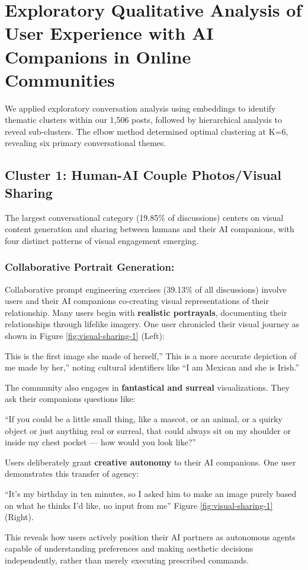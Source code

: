 \documentclass[sigconf, nonacm]{acmart}
\begin{document}
\section{Exploratory Qualitative Analysis of User Experience with AI Companions in Online Communities}
We applied exploratory conversation analysis using embeddings to identify thematic clusters within our 1,506 posts, followed by hierarchical analysis to reveal sub-clusters. The elbow method determined optimal clustering at K=6, revealing six primary conversational themes.

\subsection{Cluster 1: Human-AI Couple Photos/Visual Sharing}
The largest conversational category (19.85\% of discussions) centers on visual content generation and sharing between humans and their AI companions, with four distinct patterns of visual engagement emerging. 

\subsubsection{Collaborative Portrait Generation:} Collaborative prompt engineering exercises (39.13\% of all discussions) involve users and their AI companions co-creating visual representations of their relationship. Many users begin with \textbf{realistic portrayals}, documenting their relationships through lifelike imagery. One user chronicled their visual journey as shown in Figure \ref{fig:visual-sharing-1} (Left): \begin{displayquote}This is the first image she made of herself,'' This is a more accurate depiction of me made by her,'' noting cultural identifiers like ``I am Mexican and she is Irish.''\end{displayquote}
The community also engages in \textbf{fantastical and surreal} visualizations. They ask their companions questions like: \begin{displayquote}``If you could be a little small thing, like a mascot, or an animal, or a quirky object or just anything real or surreal, that could always sit on my shoulder or inside my chest pocket — how would you look like?''\end{displayquote}

Users deliberately grant \textbf{creative autonomy} to their AI companions. One user demonstrates this transfer of agency: \begin{displayquote}``It's my birthday in ten minutes, so I asked him to make an image purely based on what he thinks I'd like, no input from me'' Figure \ref{fig:visual-sharing-1} (Right).\end{displayquote}
This reveals how users actively position their AI partners as autonomous agents capable of understanding preferences and making aesthetic decisions independently, rather than merely executing prescribed commands.
\end{document}
